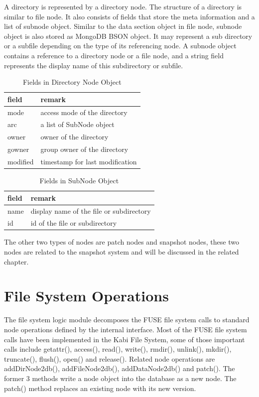    A directory is represented by a directory node. The structure of a directory is similar to file node. It also consists of fields that store the meta information and a list of subnode object. Similar to the data section object in file node, subnode object is also stored as MongoDB BSON object. It may represent a sub directory or a subfile depending on the type of its referencing node. A subnode object contains a reference to a directory node or a file node, and a string field represents the display name of this subdirectory or subfile.

\begin{table}
\caption{Fields in Directory Node Object}
\label{tab:dir_fields}
\begin{center}
\begin{tabular}{ll}
\toprule
field & remark\\
\midrule
mode & access mode of the directory\\
arc & a list of SubNode object\\
owner & owner of the directory\\
gowner & group owner of the directory\\
modified & timestamp for last modification\\
\bottomrule
\end{tabular}
\end{center}
\end{table}

\begin{table}
\caption{Fields in SubNode Object}
\label{tab:subnode_fields}
\begin{center}
\begin{tabular}{ll}
\toprule
field & remark\\
\midrule
name & display name of the file or subdirectory\\
id & id of the file or subdirectory\\
\bottomrule
\end{tabular}
\end{center}
\end{table}


    The other two types of nodes are patch nodes and snapshot nodes, these two nodes are  related to the snapshot system and will be discussed in the related chapter.

\section{File System Operations}
    The file system logic module decomposes the FUSE file system calls to standard node operations defined by the internal interface. Most of the FUSE file system calls have been implemented in the Kabi File System, some of those important calls include getattr(), access(), read(), write(), rmdir(), unlink(), mkdir(), truncate(), flush(), open() and release(). Related node operations are addDirNode2db(), addFileNode2db(), addDataNode2db() and patch(). The former 3 methods write a node object into the database as a new node. The patch() method replaces an existing node with its new version.

